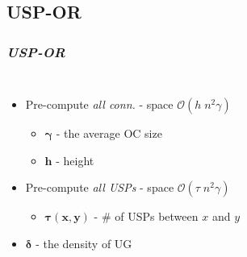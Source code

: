 \documentclass[]{beamer}
\begin{document}
        \subsection{USP-OR}
        \begin{frame}
            \frametitle{\textit{USP-OR}}
            \begin{columns}[c]
            \column{2.4in}
				\begin{itemize}
					\small
					\item<1-> Pre-compute \textit{all conn.} - space $\mathcal{O}(h \; n^{2} \gamma)$
					\begin{itemize}
						\item $\bm{\gamma}$ - the average OC size
	                	\item $\bm{h}$ - height
	                \end{itemize}
	                \item<2-> Pre-compute \textit{all USPs} - space $\mathcal{O}(\tau \; n^{2} \gamma)$
	                \begin{itemize}
	                	\item $\bm{\tau(x, y)}$ - \# of USPs between $x$ and $y$
	                \end{itemize}
	                \item<2-> $\bm{\delta}$ - the density of UG
				\end{itemize}
	        \column{2.6in}
\end{columns}
\end{frame}
\end{document}
